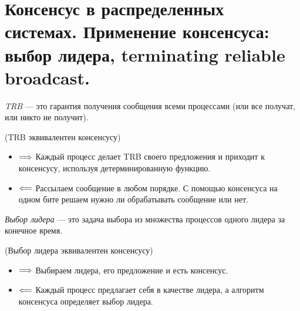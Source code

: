 \section{Консенсус в распределенных системах. Применение консенсуса: выбор лидера, terminating reliable broadcast.}

\begin{definition}
    \textit{TRB} --- это гарантия получения сообщения всеми процессами (или все получат, или никто не получит).
\end{definition}

\begin{algorithm} (TRB эквивалентен консенсусу)
    \begin{itemize}
    \item $\Longrightarrow$ Каждый процесс делает TRB своего предложения и приходит к консенсусу, используя детерминированную функцию.
    \item $\Longleftarrow$ Рассылаем сообщение в любом порядке.
        С помощью консенсуса на одном бите решаем нужно ли обрабатывать сообщение или нет.
    \end{itemize}
\end{algorithm}

\begin{definition}
    \textit{Выбор лидера} --- это задача выбора из множества процессов одного лидера за конечное время.
\end{definition}

\begin{algorithm} (Выбор лидера эквивалентен консенсусу)
    \begin{itemize}
    \item $\Longrightarrow$ Выбираем лидера, его предложение и есть консенсус.
    \item $\Longleftarrow$ Каждый процесс предлагает себя в качестве лидера, а алгоритм консенсуса определяет выбор лидера.
    \end{itemize}
\end{algorithm}